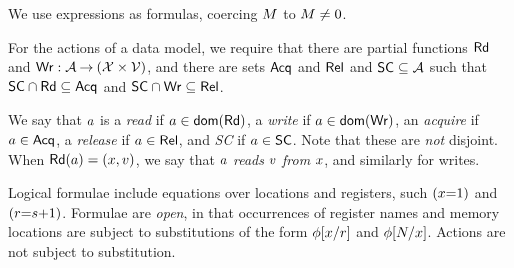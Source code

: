 We use expressions as formulas, coercing $M$ to $M\neq 0$.

For the actions of a data model, we require that
  there are partial functions $\mathsf{Rd}$ and
  $\mathsf{Wr}: \mathcal{A} \mathbin\rightarrow (\mathcal{X} \times \mathcal{V})$, and
  there are sets $\mathsf{Acq}$ and $\mathsf{Rel}$ and $\mathsf{SC} \subseteq\mathcal{A}$ such that
  $\mathsf{SC}\cap\mathsf{Rd}\subseteq\mathsf{Acq}$ and
  $\mathsf{SC}\cap\mathsf{Wr}\subseteq\mathsf{Rel}$. %

%
%
  We say that $a$ is a \emph{read} if $a\in\mathsf{dom}(\mathsf{Rd})$, a
  \emph{write} if $a\in\mathsf{dom}(\mathsf{Wr})$, an \emph{acquire} if
  $a\in\mathsf{Acq}$, a \emph{release} if $a\in\mathsf{Rel}$, and \emph{SC} if
  $a\in\mathsf{SC}$.  Note that these are \emph{not} disjoint.
When $\mathsf{Rd}(a) = (x,v)$, we say that $a$ \emph{reads}
$v$ \emph{from} $x$, and similarly for writes.



Logical formulae include equations over locations and registers, such
$(x{=}1)$ and $(r{=}s{+}1)$.  Formulae are \emph{open}, in that
occurrences of register names and memory locations are subject to
substitutions of the form $\phi[x/r]$ and $\phi[N/x]$.
Actions are not subject to substitution.


